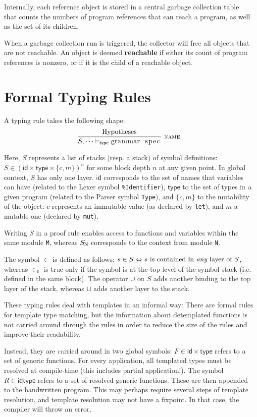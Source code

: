 \documentclass{article}
\newcommand{\code}[1]{\lstinline[columns=fixed]{#1}}
\newcommand{\drmrule}[5]{\frac{#1}{#2\vdash_{\mathsf{#3}}#4}\textsc{\ \small{#5}}}
\newcommand{\mc}[1]{\textnormal{\code{#1}}}
\begin{document}
		Internally, each reference object is stored in a central garbage collection table that counts the numbers of program references that can reach a program, as well as the set of its children.
		
		When a garbage collection run is triggered, the collector will free all objects that are not reachable. An object is deemed \textbf{reachable} if either its count of program references is nonzero, or if it is the child of a reachable object.
		
	\section{Formal Typing Rules}
	
		A typing rule takes the following shape: $$ \drmrule{\mathrm{Hypotheses}}{S,\dots}{type}{\mc{grammar spec}}{name} $$
		
		Here, $S$ represents a list of stacks (resp. a stack) of symbol definitions: $S \in (\mathsf{id} \times \mathsf{type} \times \{c,m\})^n$ for some block depth $n$ at any given point. In global context, $S$ has only one layer. $\mathsf{id}$ corresponds to the set of names that variables can have (related to the Lexer symbol \texttt{\%Identifier}), $\mathsf{type}$ to the set of types in a given program (related to the Parser symbol \texttt{Type}), and $\{c,m\}$ to the mutability of the object: $c$ represents an immutable value (as declared by \code{let}), and $m$ a mutable one (declared by \code{mut}).
		
		Writing $S$ in a proof rule enables access to functions and variables within the same module \code{M}, whereas $S_{\mc{N}}$ corresponds to the context from module \code{N}.
		
		The symbol $\in$ is defined as follows: $s\in S \Leftrightarrow \textnormal{$s$ is contained in \textit{any} layer of $S$}$, whereas $\in_0$ is true only if the symbol is at the top level of the symbol stack (i.e. defined in the same block). The operator $\cup$ on $S$ adds another binding to the top layer of the stack, whereas $\sqcup$ adds another layer to the stack.
		
		These typing rules deal with templates in an informal way: There are formal rules for template type matching, but the information about detemplated functions is not carried around through the rules in order to reduce the size of the rules and improve their readability.
		
		Instead, they are carried around in two global symbols: $F \in \mathsf{id} \times \mathsf{type}$ refers to a set of generic functions. For every application, all templated types must be resolved at compile-time (this includes partial application!). The symbol $R \in \mathsf{id} \mathsf{type}$ refers to a set of resolved generic functions. These are then appended to the handwritten program. This may perhaps require several steps of template resolution, and template resolution may not have a fixpoint. In that case, the compiler will throw an error.
		
\end{document}
